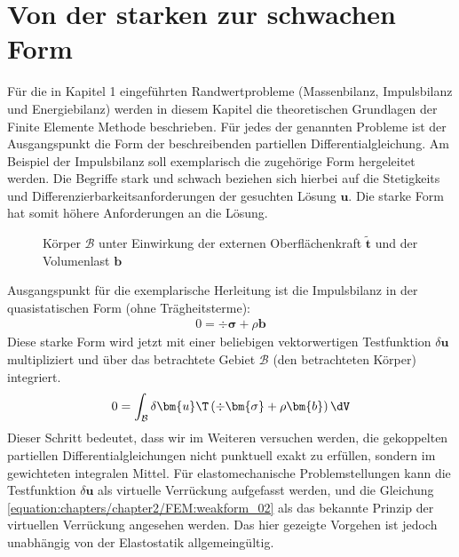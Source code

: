 \documentclass[letterpaper,10pt,german]{jupyterBook}
\let\sphinxpxdimen\pdfpxdimen\else\newdimen\sphinxpxdimen
\begin{document}
\section{Von der starken zur schwachen Form}
\label{\detokenize{chapters/chapter2/FEM:von-der-starken-zur-schwachen-form}}\label{\detokenize{chapters/chapter2/FEM::doc}}
\sphinxAtStartPar
Für die in Kapitel 1 eingeführten Randwertprobleme (Massenbilanz, Impulsbilanz und Energiebilanz) werden in diesem Kapitel die theoretischen Grundlagen der Finite Elemente Methode beschrieben. Für jedes der genannten Probleme ist der Ausgangspunkt die  Form der beschreibenden partiellen Differentialgleichung. Am Beispiel der Impulsbilanz soll exemplarisch die zugehörige  Form hergeleitet werden. Die Begriffe stark und schwach beziehen sich hierbei auf die Stetigkeits\sphinxhyphen{} und Differenzierbarkeitsanforderungen der gesuchten Lösung \(\bm{u}\). Die starke Form hat somit  höhere Anforderungen an die Lösung.

\begin{figure}[htbp]
\centering
\capstart

\noindent\sphinxincludegraphics[height=400\sphinxpxdimen]{{Impulsbilanz}.jpg}
\caption{Körper \(\mathcal{B}\) unter Einwirkung der externen Oberflächenkraft \(\tilde{\bm{t}}\) und der Volumenlast \(\bm{b}\)}\label{\detokenize{chapters/chapter2/FEM:impulsbilanz-fig}}\end{figure}

\sphinxAtStartPar
Ausgangspunkt für die exemplarische Herleitung ist die Impulsbilanz in der quasistatischen Form (ohne Trägheitsterme):
\begin{equation}\label{equation:chapters/chapter2/FEM:weakform_01}
\begin{split}0 = \div{\bm{\sigma}} + \rho \bm{b} \end{split}
\end{equation}
\sphinxAtStartPar
Diese starke Form wird jetzt mit einer beliebigen vektorwertigen Testfunktion \(\delta \bm{u}\) multipliziert und über das betrachtete Gebiet \(\mathcal{B}\) (den betrachteten Körper) integriert.
\begin{equation}\label{equation:chapters/chapter2/FEM:weakform_02}
\begin{split}0 = \int_{\mathcal{B}} \delta  \bm{u}\T \left(\div{\bm{\sigma}} + \rho \bm{b} \right) \dV\end{split}
\end{equation}
\sphinxAtStartPar
Dieser Schritt bedeutet, dass wir im Weiteren versuchen werden, die gekoppelten partiellen Differentialgleichungen nicht punktuell exakt zu erfüllen, sondern im gewichteten integralen Mittel. Für elastomechanische Problemstellungen kann die Testfunktion \(\delta \bm{u}\) als virtuelle Verrückung aufgefasst werden, und die Gleichung \eqref{equation:chapters/chapter2/FEM:weakform_02} als das bekannte Prinzip der virtuellen Verrückung angesehen werden. Das hier gezeigte Vorgehen ist jedoch unabhängig von der Elastostatik allgemeingültig.
\end{document}
